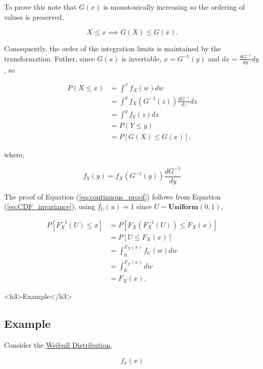 \documentclass[12pt]{article}
\begin{document}
To prove this note that $G(x)$ is monotonically increasing so the ordering of values is preserved,

$$ X \le x \implies G(X) \le G(x).$$

Consequently, the order of the integration limits is maintained by the transformation. Futher, since $G(x)$ is invertable,
$x = G^{-1}(y)$ and $dx = \frac{dG^{-1}}{dy} dy$, so

$$
\begin{aligned}
P(X \leq x) & = \int^{x} f_X(w) dw \\
& = \int^{y} f_X(G^{-1}(z)) \frac{dG^{-1}}{dz} dz \\
& = \int^{y} f_Y(z) dz \\
& = P(Y \leq y) \\
& = P[G(X) \leq G(x)],
\end{aligned}
$$

where,

$$ f_Y(y) = f_X(G^{-1}(y)) \frac{dG^{-1}}{dy} $$

The proof of Equation (\ref{eq:continuous_proof}) follows from Equation (\ref{eq:CDF_invariance}), using $f_U(u) = 1$
since $U \sim \textbf{Uniform}(0, 1),$

$$
\begin{aligned}
P[F_X^{-1}(U) \leq x] & = P[F_X(F_X^{-1}(U)) \leq F_X(x)] \\
& = P[U \leq F_X(x)] \\
& = \int_{0}^{F_X(x)} f_U(w) dw \\
& = \int_{0}^{F_X(x)} dw \\
& = F_X(x).
\end{aligned}
$$

\ifblog
<h3>Example</h3>
\fi
\iftex
\subsection{Example}
\fi

Consider the \href{https://en.wikipedia.org/wiki/Weibull_distribution}{Weibull Distribution},

\begin{equation}
\label{eq:Weibull_distribution}
f_x(x)
\end{equation}
\end{document}
